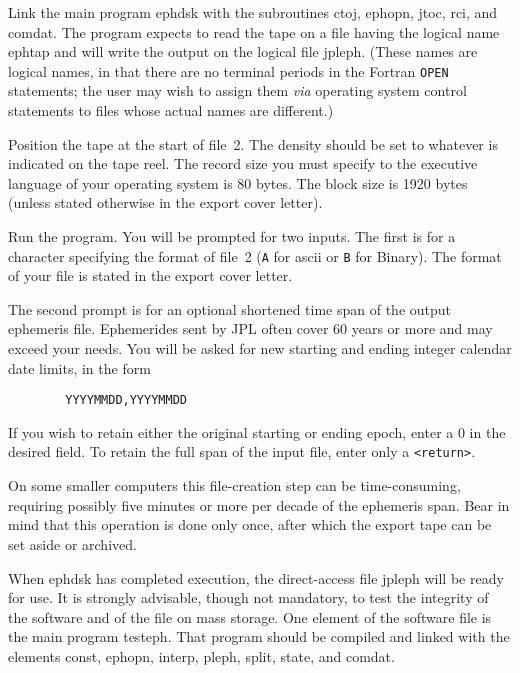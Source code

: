 Link the main program {\csc ephdsk} with the subroutines {\csc ctoj, ephopn,
jtoc, rci}, and {\csc comdat}. The program expects to read the tape on a
file having the logical name {\csc ephtap} and will write the output on the
logical file {\csc jpleph}. (These names are logical names, in that there
are no terminal periods in the Fortran {\tt OPEN} statements; the user
may wish to assign them {\sl via} operating system control
statements to files whose actual names are different.)
 
Position the tape at the start of file~2.
The density should be set to whatever is indicated
on the tape reel. The record size you must specify to the
executive language of your operating system is 80 bytes. The
block size is 1920 bytes (unless stated otherwise in the export
cover letter).
 
Run the program.
You will be prompted for two inputs.
The first is for a character specifying the format of file~2
({\tt A} for {\csc ascii} or {\tt B} for Binary). The format of your
file is stated in the export cover letter.
 
The second prompt is for an optional shortened time span of the
output ephemeris file. Ephemerides sent by JPL often cover
60 years or more and may exceed your needs.
You will be asked for new starting and ending integer
calendar date limits, in the form
\begin{verbatim}
        YYYYMMDD,YYYYMMDD
\end{verbatim}
 
If you wish to retain either the original starting or ending epoch,
enter a 0 in the desired field. To retain the full span
of the input file, enter only a {\tt <return>}.
 
On some smaller computers this file-creation
step can be time-consuming, requiring possibly five minutes or
more per decade of the ephemeris span. Bear in mind that this
operation is done only once, after which the export tape
can be set aside or archived.
 
When {\csc ephdsk} has completed execution, the direct-access file
{\csc jpleph} will be ready for use. It is strongly advisable, though
not mandatory, to test the integrity of the software
and of the file on mass storage.
One element of the software file is the main program {\csc testeph}.
That program should be compiled and linked with the elements
{\csc const, ephopn, interp, pleph, split, state}, and {\csc
comdat}.
 
